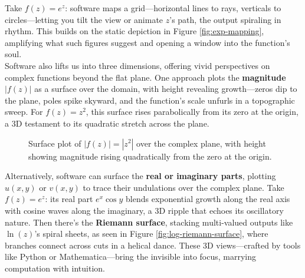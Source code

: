\noindent Take $f(z) = e^z$: software maps a grid—horizontal lines to rays, verticals to circles—letting you tilt the view or animate $z$’s path, the output spiraling in rhythm. This builds on the static depiction in Figure \ref{fig:exp-mapping}, amplifying what such figures suggest and opening a window into the function’s soul. \\

\noindent Software also lifts us into three dimensions, offering vivid perspectives on complex functions beyond the flat plane. One approach plots the \textbf{magnitude $|f(z)|$} as a surface over the domain, with height revealing growth—zeros dip to the plane, poles spike skyward, and the function’s scale unfurls in a topographic sweep. For $f(z) = z^2$, this surface rises parabolically from its zero at the origin, a 3D testament to its quadratic stretch across the plane.

\begin{figure}[h]
\centering
{}
\caption{Surface plot of $|f(z)| = |z^2|$ over the complex plane, with height showing magnitude rising quadratically from the zero at the origin.}
\label{fig:magnitude-z2}
\end{figure}

\noindent Alternatively, software can surface the \textbf{real or imaginary parts}, plotting $u(x, y)$ or $v(x, y)$ to trace their undulations over the complex plane. Take $f(z) = e^z$: its real part $e^x \cos y$ blends exponential growth along the real axis with cosine waves along the imaginary, a 3D ripple that echoes its oscillatory nature. Then there’s the \textbf{Riemann surface}, stacking multi-valued outputs like $\ln(z)$’s spiral sheets, as seen in Figure \ref{fig:log-riemann-surface}, where branches connect across cuts in a helical dance. These 3D views—crafted by tools like Python or Mathematica—bring the invisible into focus, marrying computation with intuition.

